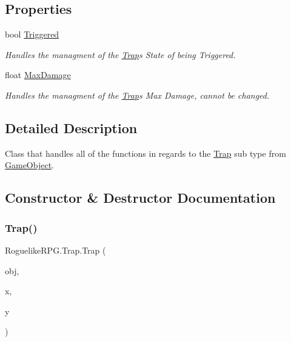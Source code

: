 \subsection*{Properties}
\begin{DoxyCompactItemize}
\item 
bool \mbox{\hyperlink{class_roguelike_r_p_g_1_1_trap_a2be484e07ac0dba84b5f1a8d5235db67}{Triggered}}
\begin{DoxyCompactList}\small\item\em Handles the managment of the \mbox{\hyperlink{class_roguelike_r_p_g_1_1_trap}{Trap}}\textquotesingle{}s State of being Triggered. \end{DoxyCompactList}\item 
float \mbox{\hyperlink{class_roguelike_r_p_g_1_1_trap_a4a52d250eebe047304262c389b4f82c7}{Max\+Damage}}
\begin{DoxyCompactList}\small\item\em Handles the managment of the \mbox{\hyperlink{class_roguelike_r_p_g_1_1_trap}{Trap}}\textquotesingle{}s Max Damage, cannot be changed. \end{DoxyCompactList}\end{DoxyCompactItemize}


\subsection{Detailed Description}
Class that handles all of the functions in regards to the \mbox{\hyperlink{class_roguelike_r_p_g_1_1_trap}{Trap}} sub type from \mbox{\hyperlink{class_roguelike_r_p_g_1_1_game_object}{Game\+Object}}. 



\subsection{Constructor \& Destructor Documentation}
\mbox{\label{class_roguelike_r_p_g_1_1_trap_a75f7e3f09db85a57be63fea667c72ad9}} 
\subsubsection{\texorpdfstring{Trap()}{Trap()}}
{\footnotesize\ttfamily Roguelike\+R\+P\+G.\+Trap.\+Trap (\begin{DoxyParamCaption}\item[{\mbox{\hyperlink{struct_roguelike_r_p_g_1_1_object_data}{Object\+Data}}}]{obj,  }\item[{int}]{x,  }\item[{int}]{y }\end{DoxyParamCaption})\hspace{0.3cm}{\ttfamily [inline]}}



